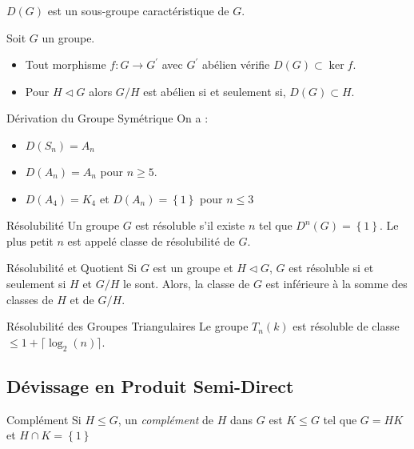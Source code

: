 \documentclass{cours}
\begin{document}
\begin{corollaire}{}{}
    $D(G)$ est un sous-groupe caractéristique de $G$.
\end{corollaire}

\begin{corollaire}{}{}
    Soit $G$ un groupe.
    \begin{itemize}
        \item Tout morphisme $f : G \rightarrow G^{'}$ avec $G^{'}$ abélien vérifie $D(G) \subset \ker f$.
        \item Pour $H \lhd G$ alors $G/H$ est abélien si et seulement si, $D(G) \subset H$.
    \end{itemize}
\end{corollaire}

\begin{propositionfr}{Dérivation du Groupe Symétrique}{}
    On a :
    \begin{itemize}
        \item $D(S_{n}) = A_{n}$
        \item $D(A_{n}) = A_{n}$ pour $n \geq 5$.
        \item $D(A_{4}) = K_{4}$ et $D(A_{n}) = \left\{1\right\}$ pour $n \leq 3$
    \end{itemize}
\end{propositionfr}


\begin{définition}{Résolubilité}{}
    Un groupe $G$ est résoluble s'il existe $n$ tel que $D^{n}(G) = \left\{1\right\}$. Le plus petit $n$ est appelé classe de résolubilité de $G$.
\end{définition}

\begin{propositionfr}{Résolubilité et Quotient}{}
    Si $G$ est un groupe et $H \lhd G$, $G$ est résoluble si et seulement si $H$ et $G/H$ le sont. Alors, la classe de $G$ est inférieure à la somme des classes de $H$ et de $G/H$.
\end{propositionfr}

\begin{propositionfr}{Résolubilité des Groupes Triangulaires}{}
    Le groupe $T_{n}(k)$ est résoluble de classe $\leq 1 + \lceil \log_{2}(n) \rceil$.
\end{propositionfr}

\subsection{Dévissage en Produit Semi-Direct}
\begin{définition}{Complément}{}
    Si $H \leq G$, un \emph{complément} de $H$ dans $G$ est $K\leq G$ tel que $G = HK$ et $H \cap K = \left\{1\right\}$
\end{définition}
\end{document}
